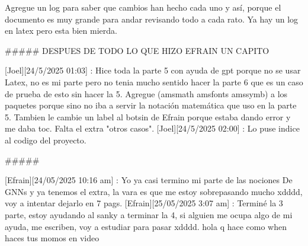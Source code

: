 Agregue un log para saber que cambios han hecho cada uno y así, porque el documento es muy grande para andar revisando todo a cada rato. Ya hay un log en latex pero esta bien mierda.

#####
DESPUES DE TODO LO QUE HIZO EFRAIN UN CAPITO

[Joel][24/5/2025 01:03] : Hice toda la parte 5 con ayuda de gpt porque no se usar Latex, no es mi parte pero no tenia mucho sentido hacer la parte 6 que es un caso de prueba de esto sin hacer la 5. Agregue ({amsmath} {amsfonts} {amssymb}) a los paquetes porque sino no iba a servir la notación matemática que uso en la parte 5. Tambien le cambie un label al botsin de Efrain porque estaba dando error y me daba toc. Falta el extra "otros casos".
[Joel][24/5/2025 02:00] : Lo puse indice al codigo del proyecto.

#####

[Efrain][24/05/2025 10:16 am] : Yo ya casi termino mi parte de las nociones De GNNs y ya tenemos el extra, la vara es que me estoy sobrepasando mucho xdddd, voy a intentar dejarlo en 7 pags.
[Efrain][25/05/2025 3:07 am] : Terminé la 3 parte, estoy ayudando al sanky a terminar la 4, si alguien me ocupa algo de mi ayuda, me escriben, voy a estudiar para pasar xdddd.
hola q hace
como when haces tus momos en video